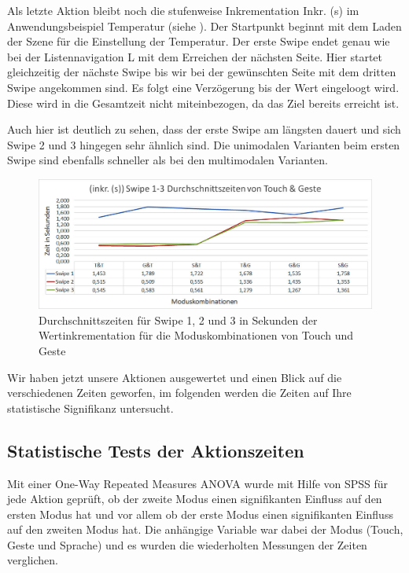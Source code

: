 Als letzte Aktion bleibt noch die stufenweise Inkrementation Inkr. (s) im Anwendungsbeispiel Temperatur (siehe ). Der Startpunkt beginnt mit dem Laden der Szene für die Einstellung der Temperatur. Der erste Swipe endet genau wie bei der Listennavigation L mit dem Erreichen der nächsten Seite. Hier startet gleichzeitig der nächste Swipe bis wir bei der gewünschten Seite mit dem dritten Swipe angekommen sind. Es folgt eine Verzögerung bis der Wert eingeloogt wird. Diese wird in die Gesamtzeit nicht miteinbezogen, da das Ziel bereits erreicht ist. 

Auch hier ist deutlich zu sehen, dass der erste Swipe am längsten dauert und sich Swipe 2 und 3 hingegen sehr ähnlich sind. Die unimodalen Varianten beim ersten Swipe sind ebenfalls schneller als bei den multimodalen Varianten.
\begin{figure}[ht]
  \centering
  \includegraphics[width=1\textwidth]{img/Swipe1-3_Klima.JPG}
  \caption[Durchschnittszeiten für Inkr. (s)]{Durchschnittszeiten für Swipe 1, 2 und 3 in Sekunden der Wertinkrementation für die Moduskombinationen von Touch und Geste}
  \label{fig:SwipeKlima}
\end{figure} 

Wir haben jetzt unsere Aktionen ausgewertet und einen Blick auf die verschiedenen Zeiten geworfen, im folgenden werden die Zeiten auf Ihre statistische Signifikanz untersucht. 

\subsection[Statistische Tests]{Statistische Tests der Aktionszeiten}
Mit einer One-Way Repeated Measures ANOVA wurde mit Hilfe von SPSS für jede Aktion geprüft, ob der zweite Modus einen signifikanten Einfluss auf den ersten Modus hat und vor allem ob der erste Modus einen signifikanten Einfluss auf den zweiten Modus hat. Die anhängige Variable war dabei der Modus (Touch, Geste und Sprache) und es wurden die wiederholten Messungen der Zeiten verglichen. 

